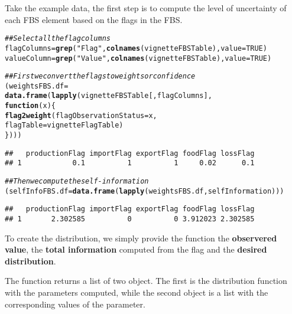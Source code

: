 \documentclass[nojss]{jss}\usepackage[]{graphicx}\usepackage[]{color}
\makeatletter
\newcommand{\hlnum}[1]{\textcolor[rgb]{0.686,0.059,0.569}{#1}}%
\newcommand{\hlstr}[1]{\textcolor[rgb]{0.192,0.494,0.8}{#1}}%
\newcommand{\hlcom}[1]{\textcolor[rgb]{0.678,0.584,0.686}{\textit{#1}}}%
\newcommand{\hlstd}[1]{\textcolor[rgb]{0.345,0.345,0.345}{#1}}%
\newcommand{\hlkwa}[1]{\textcolor[rgb]{0.161,0.373,0.58}{\textbf{#1}}}%
\newcommand{\hlkwb}[1]{\textcolor[rgb]{0.69,0.353,0.396}{#1}}%
\newcommand{\hlkwc}[1]{\textcolor[rgb]{0.333,0.667,0.333}{#1}}%
\newcommand{\hlkwd}[1]{\textcolor[rgb]{0.737,0.353,0.396}{\textbf{#1}}}%
\newenvironment{kframe}{%
 \def\at@end@of@kframe{}%
 \ifinner\ifhmode%
  \def\at@end@of@kframe{\end{minipage}}%
  \begin{minipage}{\columnwidth}%
 \fi\fi%
 \def\FrameCommand##1{\hskip\@totalleftmargin \hskip-\fboxsep
 \colorbox{shadecolor}{##1}\hskip-\fboxsep
     \hskip-\linewidth \hskip-\@totalleftmargin \hskip\columnwidth}%
 \MakeFramed {\advance\hsize-\width
   \@totalleftmargin\z@ \linewidth\hsize
   \@setminipage}}%
 {\par\unskip\endMakeFramed%
 \at@end@of@kframe}
\newenvironment{knitrout}{}{} %
\makeatother
\begin{document}
Take the example data, the first step is to compute the level of
uncertainty of each FBS element based on the flags in the FBS.



\begin{knitrout}
\color{fgcolor}\begin{kframe}
\begin{alltt}
\hlcom{## Select all the flag columns}
\hlstd{flagColumns} \hlkwb{=} \hlkwd{grep}\hlstd{(}\hlstr{"Flag"}\hlstd{,} \hlkwd{colnames}\hlstd{(vignetteFBSTable),} \hlkwc{value} \hlstd{=} \hlnum{TRUE}\hlstd{)}
\hlstd{valueColumn} \hlkwb{=} \hlkwd{grep}\hlstd{(}\hlstr{"Value"}\hlstd{,} \hlkwd{colnames}\hlstd{(vignetteFBSTable),} \hlkwc{value} \hlstd{=} \hlnum{TRUE}\hlstd{)}

\hlcom{## First we convert the flags to weights or confidence}
\hlstd{(weightsFBS.df} \hlkwb{=}
     \hlkwd{data.frame}\hlstd{(}\hlkwd{lapply}\hlstd{(vignetteFBSTable[, flagColumns],}
                       \hlkwa{function}\hlstd{(}\hlkwc{x}\hlstd{) \{}
                           \hlkwd{flag2weight}\hlstd{(}\hlkwc{flagObservationStatus} \hlstd{= x,}
                                       \hlkwc{flagTable} \hlstd{= vignetteFlagTable)}
                                    \hlstd{\})))}
\end{alltt}
\begin{verbatim}
##   productionFlag importFlag exportFlag foodFlag lossFlag
## 1            0.1          1          1     0.02      0.1
\end{verbatim}
\begin{alltt}
\hlcom{## Then we compute the self-information}
\hlstd{(selfInfoFBS.df} \hlkwb{=} \hlkwd{data.frame}\hlstd{(}\hlkwd{lapply}\hlstd{(weightsFBS.df, selfInformation)))}
\end{alltt}
\begin{verbatim}
##   productionFlag importFlag exportFlag foodFlag lossFlag
## 1       2.302585          0          0 3.912023 2.302585
\end{verbatim}
\end{kframe}
\end{knitrout}


To create the distribution, we simply provide the function
 the \textbf{observered value}, the \textbf{total
  information} computed from the flag and the \textbf{desired
  distribution}.

The function returns a list of two object. The first is the
distribution function with the parameters computed, while the second
object is a list with the corresponding values of the parameter.
\end{document}
